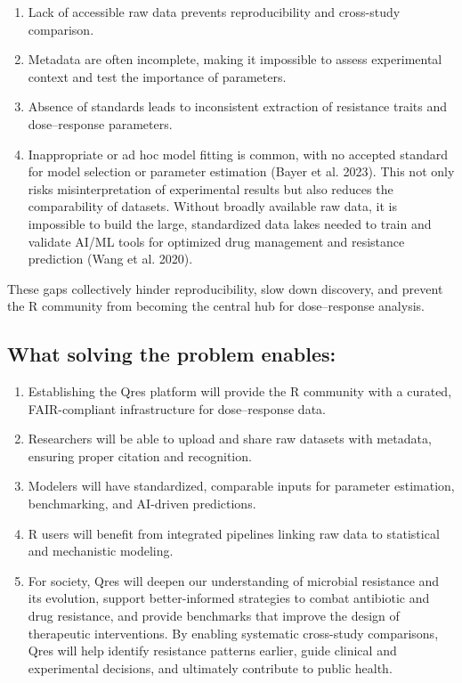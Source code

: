 \documentclass[
  letterpaper,
  DIV=11,
  numbers=noendperiod]{scrartcl}
\providecommand{\tightlist}{%
  \setlength{\itemsep}{0pt}\setlength{\parskip}{0pt}}
\begin{document}
\begin{enumerate}
\def\labelenumi{\arabic{enumi}.}
\tightlist
\item
  Lack of accessible raw data prevents reproducibility and cross-study
  comparison.
\item
  Metadata are often incomplete, making it impossible to assess
  experimental context and test the importance of parameters.
\item
  Absence of standards leads to inconsistent extraction of resistance
  traits and dose--response parameters.
\item
  Inappropriate or ad hoc model fitting is common, with no accepted
  standard for model selection or parameter estimation (Bayer et al.
  2023). This not only risks misinterpretation of experimental results
  but also reduces the comparability of datasets. Without broadly
  available raw data, it is impossible to build the large, standardized
  data lakes needed to train and validate AI/ML tools for optimized drug
  management and resistance prediction (Wang et al. 2020).
\end{enumerate}

These gaps collectively hinder reproducibility, slow down discovery, and
prevent the R community from becoming the central hub for dose--response
analysis.

\subsection{What solving the problem
enables:}\label{what-solving-the-problem-enables}

\begin{enumerate}
\def\labelenumi{\arabic{enumi}.}
\tightlist
\item
  Establishing the Qres platform will provide the R community with a
  curated, FAIR-compliant infrastructure for dose--response data.
\item
  Researchers will be able to upload and share raw datasets with
  metadata, ensuring proper citation and recognition.
\item
  Modelers will have standardized, comparable inputs for parameter
  estimation, benchmarking, and AI-driven predictions.
\item
  R users will benefit from integrated pipelines linking raw data to
  statistical and mechanistic modeling.
\item
  For society, Qres will deepen our understanding of microbial
  resistance and its evolution, support better-informed strategies to
  combat antibiotic and drug resistance, and provide benchmarks that
  improve the design of therapeutic interventions. By enabling
  systematic cross-study comparisons, Qres will help identify resistance
  patterns earlier, guide clinical and experimental decisions, and
  ultimately contribute to public health.
\end{enumerate}
\end{document}
